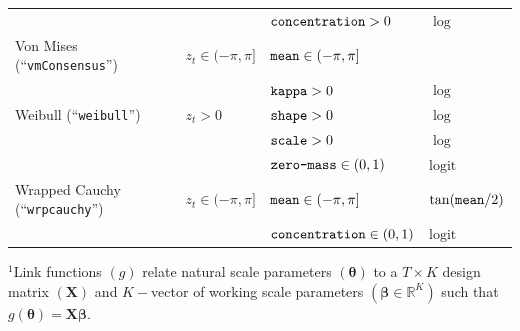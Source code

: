 \documentclass[12pt]{article}\usepackage[]{graphicx}\usepackage[]{color}
\begin{document}
\begin{small}
\begin{table}
\begin{tabular}{llll}
  \rowcolor{Gray}                             &                               & $\verb|concentration|>0$                        &  $\log$ \tabularnewline 
  Von Mises (``\verb|vmConsensus|'')          & $z_t\in(-\pi,\pi]$            & $\verb|mean|\in(-\pi,\pi]$                      &  \citeauthor{RivestEtAl2016} \tabularnewline  
                                              &                               & $\verb|kappa|>0$                                &  $\log$ \tabularnewline 
  \rowcolor{Gray} Weibull (``\verb|weibull|'')& $z_t>0$                       & $\verb|shape|>0$                                &  $\log$ \tabularnewline  
  \rowcolor{Gray}                             &                               & $\verb|scale|>0$                                &  $\log$ \tabularnewline  
  \rowcolor{Gray}                             &                               & $\verb|zero-mass|\in(0,1)$                      &  $\text{logit}$ \tabularnewline 
  Wrapped Cauchy (``\verb|wrpcauchy|'')       & $z_t\in(-\pi,\pi]$            & $\verb|mean|\in(-\pi,\pi]$                      &  $\tan(\verb|mean|/2)$ \tabularnewline  
                                              &                               & $\verb|concentration|\in(0,1)$                  &  $\text{logit}$ \tabularnewline 
  \bottomrule
  \end{tabular}
  \footnotesize{$^1$Link functions $(g)$ relate natural scale parameters $({\boldsymbol \theta})$ to a $T \times K$ design matrix $({\mathbf X})$ and $K-$vector of working scale parameters $(\boldsymbol{\beta}\in \mathbb{R}^K)$ such that $g({\boldsymbol \theta})={\mathbf X}\boldsymbol{\beta}$. %
}
\end{table}
\end{small}
\end{document}
